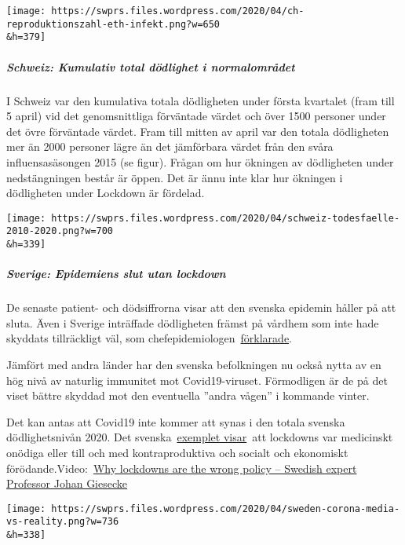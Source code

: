 \texttt{[image: https://swprs.files.wordpress.com/2020/04/ch-reproduktionszahl-eth-infekt.png?w=650\\\&h=379]}

\hypertarget{schweiz-kumulativ-total-duxf6dlighet-i-normalomruxe5det}{%
\subparagraph{\texorpdfstring{\textbf{Schweiz: Kumulativ total dödlighet
i
normalområdet}}{Schweiz: Kumulativ total dödlighet i normalområdet}}\label{schweiz-kumulativ-total-duxf6dlighet-i-normalomruxe5det}}

I Schweiz var den kumulativa totala dödligheten under första kvartalet
(fram till 5 april) vid det genomsnittliga förväntade värdet och över
1500 personer under det övre förväntade värdet. Fram till mitten av
april var den totala dödligheten mer än 2000 personer lägre än det
jämförbara värdet från den svåra influensasäsongen 2015 (se figur).
Frågan om hur ökningen av dödligheten under nedstängningen består är
öppen. Det är ännu inte klar hur ökningen i dödligheten under Lockdown
är fördelad.

\texttt{[image: https://swprs.files.wordpress.com/2020/04/schweiz-todesfaelle-2010-2020.png?w=700\\\&h=339]}

\hypertarget{sverige-epidemiens-slut-utan-lockdown}{%
\subparagraph{\texorpdfstring{\textbf{Sverige: Epidemiens slut utan
lockdown}}{Sverige: Epidemiens slut utan lockdown}}\label{sverige-epidemiens-slut-utan-lockdown}}

De senaste patient- och dödsiffrorna visar att den svenska epidemin
håller på att sluta. Även i Sverige inträffade dödligheten främst på
vårdhem som inte hade skyddats tillräckligt väl, som
chefepidemiologen~\href{https://www.washingtontimes.com/news/2020/apr/15/sweden-coronavirus-rates-easing-despite-loose-rule/}{förklarade}.

Jämfört med andra länder har den svenska befolkningen nu också nytta av
en hög nivå av naturlig immunitet mot Covid19-viruset. Förmodligen är de
på det viset bättre skyddad mot den eventuella ''andra vågen'' i
kommande vinter.

Det kan antas att Covid19 inte kommer att synas i den totala svenska
dödlighetsnivån 2020. Det
svenska~\href{https://www.kleinezeitung.at/international/corona/5802224/Anzeichen-fuer-Entspannung_Schweden-sieht-sich-auf-dem-richtigen-Weg}{exemplet
visar}~att lockdowns var medicinskt onödiga eller till och med
kontraproduktiva och socialt och ekonomiskt
förödande.Video:~\href{https://www.youtube.com/watch?v=bfN2JWifLCY}{Why
lockdowns are the wrong policy -- Swedish expert Professor Johan
Giesecke}

\texttt{[image: https://swprs.files.wordpress.com/2020/04/sweden-corona-media-vs-reality.png?w=736\\\&h=338]}

